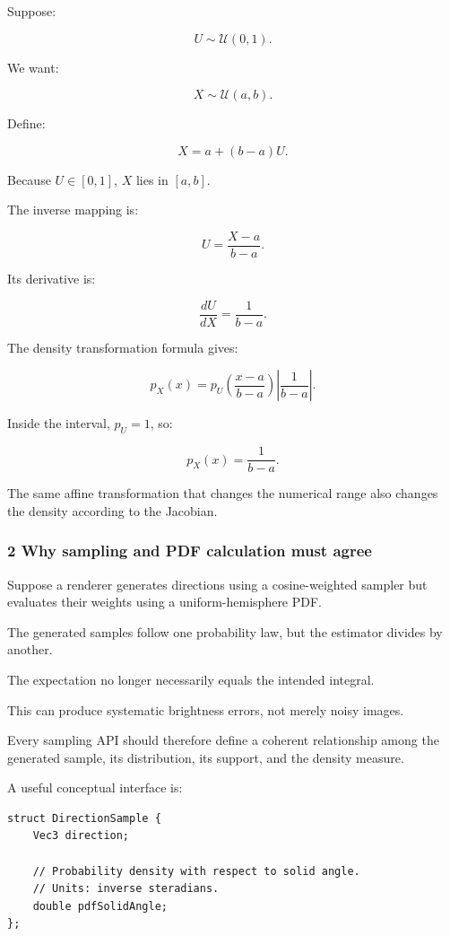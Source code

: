 Suppose:

\[
 U\sim\mathcal U(0,1).
\]

We want:

\[
 X\sim\mathcal U(a,b).
\]

Define:

\[
 \boxed{X=a+(b-a)U}.
\]

Because \(U\in[0,1]\), \(X\) lies in \([a,b]\).

The inverse mapping is:

\[
 U=\frac{X-a}{b-a}.
\]

Its derivative is:

\[
 \frac{dU}{dX}=\frac1{b-a}.
\]

The density transformation formula gives:

\[
 p_X(x)= p_U\left(\frac{x-a}{b-a}\right) \left|\frac1{b-a}\right|.
\]

Inside the interval, \(p_U=1\), so:

\[
 \boxed{p_X(x)=\frac1{b-a}}.
\]

The same affine transformation that changes the numerical range also changes the density according to the Jacobian.

\subsubsection{2 Why sampling and PDF calculation must agree}\label{02-foundations-ii-ch029-why-sampling-and-pdf-calculation-must-agree}

Suppose a renderer generates directions using a cosine-weighted sampler but evaluates their weights using a uniform-hemisphere PDF.

The generated samples follow one probability law, but the estimator divides by another.

The expectation no longer necessarily equals the intended integral.

This can produce systematic brightness errors, not merely noisy images.

Every sampling API should therefore define a coherent relationship among the generated sample, its distribution, its support, and the density measure.

A useful conceptual interface is:

\begin{verbatim}
struct DirectionSample {
    Vec3 direction;

    // Probability density with respect to solid angle.
    // Units: inverse steradians.
    double pdfSolidAngle;
};
\end{verbatim}


